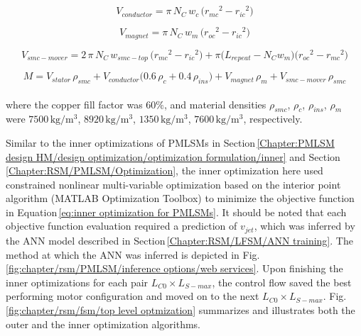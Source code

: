                 
                \begin{equation}
                    V_{conductor} = \pi\,N_C\,w_c\,\big( {r_{mc}}^2-{r_{ic}}^2 \big)
                    \label{eq:rsm/LFSM/V_conductor}
                \end{equation}
                
                
                \begin{equation}
                    V_{magnet} = \pi\,N_C\,w_m\,\big( {r_{oc}}^2-{r_{ic}}^2 \big)
                    \label{eq:rsm/LFSM/V_magnet}
                \end{equation}
                
                
                \begin{equation}
                    V_{smc-mover} = 2\,\pi\,N_C\,w_{smc-top}\,\big( {r_{mc}}^2-{r_{ic}}^2 \big) + \pi \big( L_{repeat}-N_C w_m \big) \big( {r_{oc}}^2-{r_{mc}}^2 \big) 
                    \label{eq:rsm/LFSM/V_smc_mover}
                \end{equation}
                
                
                \begin{equation}
                    M= V_{stator}\,\rho_{smc} + V_{conductor} \big(0.6\,\rho_c + 0.4\,\rho_{ins} \big) + V_{magnet}\,\rho_{m} + V_{smc-mover}\,\rho_{smc}
                    \label{eq:rsm/LFSM/M}
                \end{equation} \\
                
                
                where the copper fill factor was $60\%$, and material densities $\rho_{smc}$, $\rho_c$, $\rho_{ins}$, $\rho_{m}$ were $7500\,\mathrm{kg/m^3}$, $8920\,\mathrm{kg/m^3}$, $1350\,\mathrm{kg/m^3}$, $7600\,\mathrm{kg/m^3}$, respectively. 
                
                
                Similar to the inner optimizations of \acsp{PMLSM} in Section\,\ref{Chapter:PMLSM design HM/design optimization/optimization formulation/inner} and Section\,\ref{Chapter:RSM/PMLSM/Optimization}, the inner optimization here used constrained nonlinear multi-variable optimization based on the interior point algorithm (MATLAB Optimization Toolbox) to minimize the objective function in Equation\,\ref{eq:inner optimization for PMLSMs}. It should be noted that each objective function evaluation required a prediction of $v_{jet}$, which was inferred by the \acs{ANN} model described in Section\,\ref{Chapter:RSM/LFSM/ANN training}. The method at which the \acs{ANN} was inferred is depicted in Fig.\,\ref{fig:chapter/rsm/PMLSM/inference options/web services}. Upon finishing the inner optimizations for each pair $L_{C0} \times L_{S-max}$, the control flow saved the best performing motor configuration and moved on to the next $L_{C0} \times L_{S-max}$. Fig.\,\ref{fig:chapter/rsm/fsm/top level optmization} summarizes and illustrates both the outer and the inner optimization algorithms.
                

